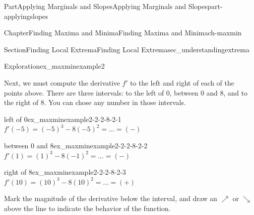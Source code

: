 \documentclass{tufte-book}
\numberwithin{equation}{chapter}
\begin{document}
\begin{partptx}{Part}{Applying Marginals and Slopes}{}{Applying Marginals and Slopes}{}{}{part-applyingslopes}
\begin{chapterptx}{Chapter}{Finding Maxima and Minima}{}{Finding Maxima and Minima}{}{}{ch-maxmin}
\begin{sectionptx}{Section}{Finding Local Extrema}{}{Finding Local Extrema}{}{}{sec_understandingextrema}
\begin{exploration}{Exploration}{}{ex_maxminexample2}
\begin{enumerate}[font=\bfseries,label=(\alph*),ref=\alph*]
\begin{image}{0.3}{0.4}{0.3}{}%
%
\end{image}%
%
\par
Next, we must compute the derivative \(f'\) to the left and right of each of the points above. There are three intervals: to the left of 0, between 0 and 8, and to the right of 8. You can chose any number in those intervals.%
\begin{descriptionlist}
\begin{dlimedium}{left of 0}{ex_maxminexample2-2-2-8-2-1}%
 \(f'(-5) = (-5)^3 - 8(-5)^2 = \dots = (-)\)\end{dlimedium}%
\begin{dlimedium}{between 0 and 8}{ex_maxminexample2-2-2-8-2-2}%
 \(f'(1) = (1)^3 - 8(-1)^2 = \dots = (-)\)\end{dlimedium}%
\begin{dlimedium}{right of 8}{ex_maxminexample2-2-2-8-2-3}%
 \(f'(10) = (10)^3 - 8(10)^2 = \dots = (+)\)\end{dlimedium}%
\end{descriptionlist}
Mark the magnitude of the derivative below the interval, and draw an \(\nearrow\) or \(\searrow\) above the line to indicate the behavior of the function.%
\par
\begin{image}{0.25}{0.5}{0.25}{}%
\end{image}
\end{enumerate}
\end{exploration}
\end{sectionptx}
\end{chapterptx}
\end{partptx}
\end{document}
